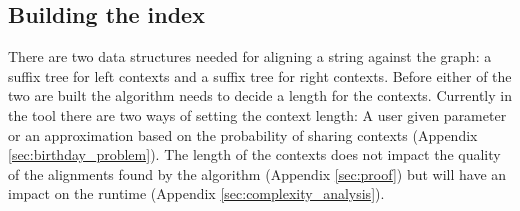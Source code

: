 \documentclass[thesis.tex]{subfiles}
\begin{document}
\subsection{Building the index}
There are two data structures needed for aligning a string against the graph: a suffix tree for left contexts and a suffix tree for right contexts. Before either of the two are built the algorithm needs to decide a length for the contexts. Currently in the tool there are two ways of setting the context length: A user given parameter or an approximation based on the probability of sharing contexts (Appendix \ref{sec:birthday_problem}). The length of the contexts does not impact the quality of the alignments found by the algorithm (Appendix \ref{sec:proof}) but will have an impact on the runtime (Appendix \ref{sec:complexity_analysis}).\\
\par\noindent
\end{document}
